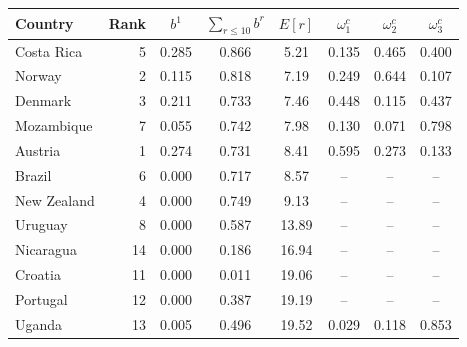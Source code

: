 \begin{tabular}{lrcccccc}
\toprule
Country & Rank & $b^1$ & $\sum_{r\le10}b^r$ & $E[r]$ & $\omega^c_1$ & $\omega^c_2$ & $\omega^c_3$ \\
\midrule
Costa Rica & 5 & 0.285 & 0.866 & 5.21 & 0.135 & 0.465 & 0.400 \\
Norway & 2 & 0.115 & 0.818 & 7.19 & 0.249 & 0.644 & 0.107 \\
Denmark & 3 & 0.211 & 0.733 & 7.46 & 0.448 & 0.115 & 0.437 \\
Mozambique & 7 & 0.055 & 0.742 & 7.98 & 0.130 & 0.071 & 0.798 \\
Austria & 1 & 0.274 & 0.731 & 8.41 & 0.595 & 0.273 & 0.133 \\
Brazil & 6 & 0.000 & 0.717 & 8.57 & -- & -- & -- \\
New Zealand & 4 & 0.000 & 0.749 & 9.13 & -- & -- & -- \\
Uruguay & 8 & 0.000 & 0.587 & 13.89 & -- & -- & -- \\
Nicaragua & 14 & 0.000 & 0.186 & 16.94 & -- & -- & -- \\
Croatia & 11 & 0.000 & 0.011 & 19.06 & -- & -- & -- \\
Portugal & 12 & 0.000 & 0.387 & 19.19 & -- & -- & -- \\
Uganda & 13 & 0.005 & 0.496 & 19.52 & 0.029 & 0.118 & 0.853 \\
\bottomrule
\end{tabular}
